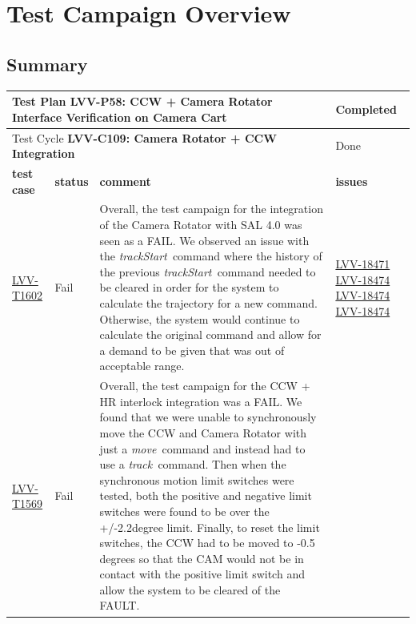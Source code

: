 \documentclass[SE,STR,toc]{lsstdoc}
\begin{document}
\newpage

\section{Test Campaign Overview}
\label{sect:overview}

\subsection{Summary}
\label{sect:summarytable}

\begin{longtable}{p{2cm}p{2.5cm}p{9cm}p{2.5cm}}
\toprule
\multicolumn{3}{l}{ Test Plan {\bf LVV-P58:  CCW + Camera Rotator Interface Verification on Camera Cart
 }} & Completed \\\hline

  \multicolumn{3}{l}{ Test Cycle {\bf LVV-C109:  Camera Rotator + CCW Integration
 }} & Done \\\hline

  {\bf \footnotesize test case} & {\bf \footnotesize status} & {\bf \footnotesize comment} & {\bf \footnotesize issues} \\\toprule

    \href{https://jira.lsstcorp.org/secure/Tests.jspa#/testCase/LVV-T1602}{LVV-T1602}
    & Fail &
    \begin{minipage}[]{9cm}
    \smallskip
     Overall, the test campaign for the integration of the Camera Rotator
with SAL 4.0 was seen as a FAIL. We observed an issue with the
\emph{trackStart~}command where the history of the previous
\emph{trackStart~}command needed to be cleared in order for the system
to calculate the trajectory for a new command. Otherwise, the system
would continue to calculate the original command and allow for a demand
to be given that was out of acceptable range.

    \medskip
    \end{minipage}
    &
          \href{https://jira.lsstcorp.org/browse/LVV-18471}{LVV-18471}
          \href{https://jira.lsstcorp.org/browse/LVV-18474}{LVV-18474}
          \href{https://jira.lsstcorp.org/browse/LVV-18474}{LVV-18474}
          \href{https://jira.lsstcorp.org/browse/LVV-18474}{LVV-18474}
    \\\hline
    \href{https://jira.lsstcorp.org/secure/Tests.jspa#/testCase/LVV-T1569}{LVV-T1569}
    & Fail &
    \begin{minipage}[]{9cm}
    \smallskip
     Overall, the test campaign for the CCW + HR interlock integration was a
FAIL. We found that we were unable to synchronously move the CCW and
Camera Rotator with just a \emph{move~}command and instead had to use a
\emph{track~}command. Then when the synchronous motion limit switches
were tested, both the positive and negative limit switches were found to
be over the +/-2.2degree limit. Finally, to reset the limit switches,
the CCW had to be moved to -0.5 degrees so that the CAM would not be in
contact with the positive limit switch and allow the system to be
cleared of the FAULT.~


\end{minipage}
\end{longtable}
\end{document}
